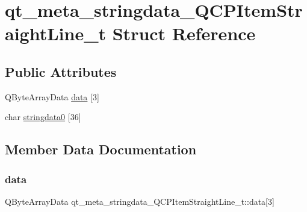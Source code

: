 \hypertarget{structqt__meta__stringdata___q_c_p_item_straight_line__t}{}\section{qt\+\_\+meta\+\_\+stringdata\+\_\+\+Q\+C\+P\+Item\+Straight\+Line\+\_\+t Struct Reference}
\label{structqt__meta__stringdata___q_c_p_item_straight_line__t}
\subsection*{Public Attributes}
\begin{DoxyCompactItemize}
\item 
Q\+Byte\+Array\+Data \mbox{\hyperlink{structqt__meta__stringdata___q_c_p_item_straight_line__t_a1b24e360df4ab7c0917a94969f909ba0}{data}} \mbox{[}3\mbox{]}
\item 
char \mbox{\hyperlink{structqt__meta__stringdata___q_c_p_item_straight_line__t_a0e2c6dce44cbc1e13041b33cd138f25d}{stringdata0}} \mbox{[}36\mbox{]}
\end{DoxyCompactItemize}


\subsection{Member Data Documentation}
\mbox{\label{structqt__meta__stringdata___q_c_p_item_straight_line__t_a1b24e360df4ab7c0917a94969f909ba0}} 
\subsubsection{\texorpdfstring{data}{data}}
{\footnotesize\ttfamily Q\+Byte\+Array\+Data qt\+\_\+meta\+\_\+stringdata\+\_\+\+Q\+C\+P\+Item\+Straight\+Line\+\_\+t\+::data\mbox{[}3\mbox{]}}

\mbox{\label{structqt__meta__stringdata___q_c_p_item_straight_line__t_a0e2c6dce44cbc1e13041b33cd138f25d}} 

